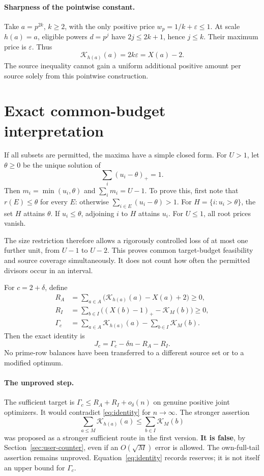 \documentclass[a4paper,11pt]{article}
\theoremstyle{remark}\newtheorem{remark}[theorem]{Remark}
\newcommand{\K}{\mathcal K}
\begin{document}
\paragraph{Sharpness of the pointwise constant.}
Take $a=p^{2k}$, $k\ge2$, with the only positive price $w_p=1/k+\varepsilon\le1$. At scale $h(a)=a$, eligible powers $d=p^j$ have $2j\le2k+1$, hence $j\le k$. Their maximum price is $\varepsilon$. Thus
\[
 \K_{h(a)}(a)=2k\varepsilon=X(a)-2.
\]
The source inequality cannot gain a uniform additional positive amount per source solely from this pointwise construction.

\section{Exact common-budget interpretation}
If all subsets are permitted, the maxima have a simple closed form. For $U>1$, let $\theta\ge0$ be the unique solution of
\[
 \sum_i(u_i-\theta)_+=1.
\]
Then $m_i=\min(u_i,\theta)$ and $\sum_i m_i=U-1$. To prove this, first note that $r(E)\le\theta$ for every $E$: otherwise $\sum_{i\in E}(u_i-\theta)>1$. For $H=\{i:u_i>\theta\}$, the set $H$ attains $\theta$. If $u_i\le\theta$, adjoining $i$ to $H$ attains $u_i$. For $U\le1$, all root prices vanish.

The size restriction therefore allows a rigorously controlled loss of at most one further unit, from $U-1$ to $U-2$. This proves common target-budget feasibility and source coverage simultaneously. It does not count how often the permitted divisors occur in an interval.

For $c=2+\delta$, define
\begin{align*}
 R_A&=\sum_{a\in A}\bigl(\K_{h(a)}(a)-X(a)+2\bigr)\ge0,\\
 R_I&=\sum_{b\in I}\bigl((X(b)-1)_+-\K_M(b)\bigr)\ge0,\\
 \Gamma_c&=\sum_{a\in A}\K_{h(a)}(a)-\sum_{b\in I}\K_M(b).
\end{align*}
Then the exact identity is
\begin{equation}\label{eq:identity}
 \boxed{J_c=\Gamma_c-\delta n-R_A-R_I.}
\end{equation}
No prime-row balances have been transferred to a different source set or to a modified optimum.

\paragraph{The unproved step.}
The sufficient target is $\Gamma_c\le R_A+R_I+o_\delta(n)$ on genuine positive joint optimizers. It would contradict \eqref{eq:identity} for $n\to\infty$. The stronger assertion
\begin{equation}\label{eq:unproved}
 \sum_{a\le M}\K_{h(a)}(a)\le\sum_{b\in I}\K_M(b)
\end{equation}
was proposed as a stronger sufficient route in the first version. \textbf{It is false}, by Section~\ref{sec:user-counter}, even if an $O(\sqrt M)$ error is allowed. The own-full-tail assertion remains unproved. Equation~\eqref{eq:identity} records reserves; it is not itself an upper bound for $\Gamma_c$.
\end{document}
